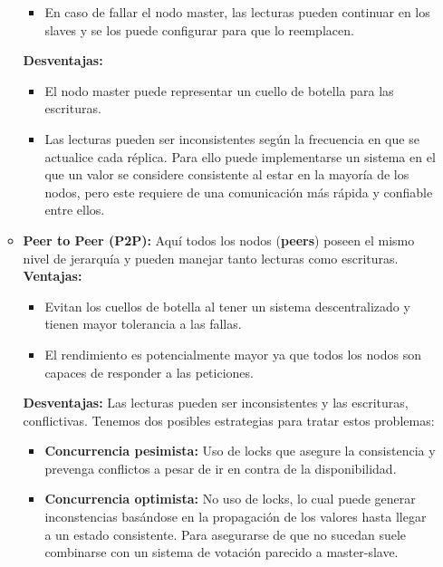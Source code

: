 \begin{itemize}
\begin{itemize}
\begin{itemize}
            \item En caso de fallar el nodo master, las lecturas pueden continuar en los slaves y se los puede configurar para que lo reemplacen.
        \end{itemize}
        \textbf{Desventajas:}
        \begin{itemize}
            \item El nodo master puede representar un cuello de botella para las escrituras.
            \item Las lecturas pueden ser inconsistentes según la frecuencia en que se actualice cada réplica. Para ello puede implementarse un sistema en el que un valor se considere consistente al estar en la mayoría de los nodos, pero este requiere de una comunicación más rápida y confiable entre ellos.
        \end{itemize}
        \item \textbf{Peer to Peer (P2P):} Aquí todos los nodos (\textbf{peers}) poseen el mismo nivel de jerarquía y pueden manejar tanto lecturas como escrituras. \\
        \textbf{Ventajas:}
        \begin{itemize}
            \item Evitan los cuellos de botella al tener un sistema descentralizado y tienen mayor tolerancia a las fallas.
            \item El rendimiento es potencialmente mayor ya que todos los nodos son capaces de responder a las peticiones.
        \end{itemize}
        \textbf{Desventajas:} Las lecturas pueden ser inconsistentes y las escrituras, conflictivas. Tenemos dos posibles estrategias para tratar estos problemas:
        \begin{itemize}
            \item \textbf{Concurrencia pesimista:} Uso de locks que asegure la consistencia y prevenga conflictos a pesar de ir en contra de la disponibilidad.
            \item \textbf{Concurrencia optimista:} No uso de locks, lo cual puede generar inconstencias basándose en la propagación de los valores hasta llegar a un estado consistente. Para asegurarse de que no sucedan suele  combinarse con un sistema de votación parecido a master-slave.
        \end{itemize}
    \end{itemize}
\end{itemize}

\hypertarget{oltp}{}
